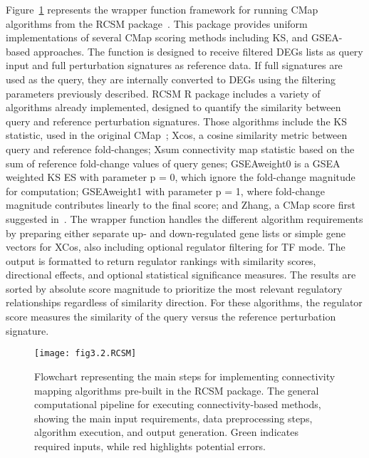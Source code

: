 Figure~\ref{fig:fig3.2.RCSM} represents the wrapper function framework for running \gls{CMap} algorithms from the \gls{RCSM} package~\cite{RN79}. 
This package provides uniform implementations of several \gls{CMap} scoring methods including \gls{KS}, and \gls{GSEA}-based approaches. 
The function is designed to receive filtered \gls{DEGs} lists as query input and full perturbation signatures as reference data. 
If full signatures are used as the query, they are internally converted to \gls{DEGs} using the filtering parameters previously described. \gls{RCSM} \gls{R} package includes a variety of algorithms already implemented, designed to quantify the similarity between query and reference perturbation signatures. 
Those algorithms include the \gls{KS} statistic, used in the original \gls{CMap}~\cite{RN34}; Xcos, a cosine similarity metric between query and reference fold-changes; Xsum connectivity map statistic based on the sum of reference fold-change values of query genes; GSEAweight0 is a \gls{GSEA} weighted \gls{KS} \gls{ES} with parameter p = 0, which ignore the fold-change magnitude for computation; GSEAweight1 with parameter p = 1, where fold-change magnitude contributes linearly to the final score; and Zhang, a \gls{CMap} score first suggested in~\cite{RN161}. 
The wrapper function handles the different algorithm requirements by preparing either separate up- and down-regulated gene lists or simple gene vectors for XCos, also including optional regulator filtering for \gls{TF} mode. 
The output is formatted to return regulator rankings with similarity scores, directional effects, and optional statistical significance measures. 
The results are sorted by absolute score magnitude to prioritize the most relevant regulatory relationships regardless of similarity direction. 
For these algorithms, the regulator score measures the similarity of the query versus the reference perturbation signature.


\begin{figure}[htbp]
    \centering
    \texttt{[image: fig3.2.RCSM]}
    \caption[Flowchart representing the main steps for implementing connectivity mapping algorithms pre-built in the RCSM package.]{Flowchart representing the main steps for implementing connectivity mapping algorithms pre-built in the \gls{RCSM} package. The general computational pipeline for executing connectivity-based methods, showing the main input requirements, data preprocessing steps, algorithm execution, and output generation. Green indicates required inputs, while red highlights potential errors.}
    \label{fig:fig3.2.RCSM}
\end{figure}


